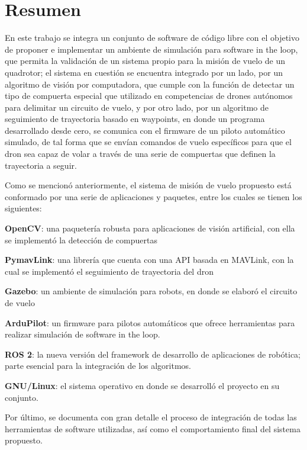 \chapter*{Resumen}
En este trabajo se integra un conjunto de software de código libre con el objetivo de proponer e implementar un ambiente de simulación para software in the loop, que permita la validación de un sistema propio para la misión de vuelo de un quadrotor; el sistema en cuestión se encuentra integrado por un lado, por un algoritmo de visión por computadora, que cumple con la función de detectar un tipo de compuerta especial que utilizado en competencias de drones autónomos para delimitar un circuito de vuelo, y por otro lado, por un algoritmo de seguimiento de trayectoria basado en waypoints, en donde un programa desarrollado desde cero, se comunica con el firmware de un piloto automático simulado, de tal forma que se envían comandos de vuelo específicos para que el dron sea capaz de volar a través de una serie de compuertas que definen la trayectoria a seguir.

Como se mencionó anteriormente, el sistema de misión de vuelo propuesto está conformado por una serie de aplicaciones y paquetes, entre los cuales se tienen los siguientes:

\textbf{OpenCV}: una paquetería robusta para aplicaciones de visión artificial, con ella se implementó la detección de compuertas

\textbf{PymavLink}: una librería que cuenta con una API basada en MAVLink, con la cual se implementó el seguimiento de trayectoria del dron

\textbf{Gazebo}: un ambiente de simulación para robots, en donde se elaboró el circuito de vuelo 

\textbf{ArduPilot}: un firmware para pilotos automáticos que ofrece herramientas para realizar simulación de software in the loop.

\textbf{ROS 2}: la nueva versión del framework de desarrollo de aplicaciones de robótica; parte esencial para la integración de los algoritmos.

\textbf{GNU/Linux}:  el sistema operativo en donde se desarrolló el proyecto en su conjunto.


Por último, se documenta con gran detalle el proceso de integración de todas las herramientas de software utilizadas, así como el comportamiento final del sistema propuesto.











